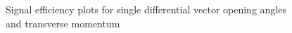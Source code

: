 \documentclass{article}
\begin{document}
\begin{figure}
    \caption{Signal efficiency plots for single differential vector opening angles and transverse momentum}
    \label{fig:sbnd-signal-efficiency-opening-angles-transverse.}
\end{figure}
\end{document}
